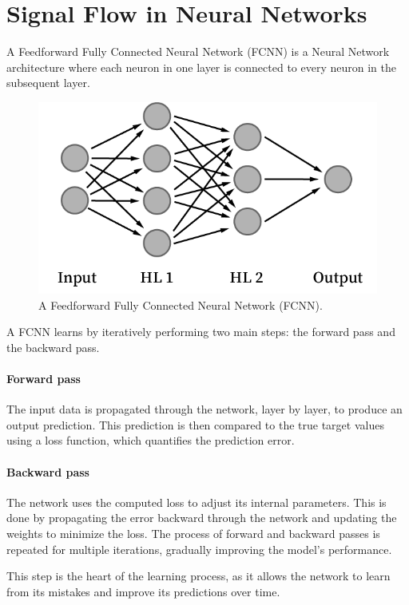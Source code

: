 \section*{Signal Flow in Neural Networks}

A Feedforward Fully Connected Neural Network (FCNN) is a Neural Network architecture where each neuron in one layer is connected to every neuron in the subsequent layer.

\begin{figure}[h]
    \centering
    \includegraphics[width=0.75\linewidth]{Images/fcnn.png}
    \caption{A Feedforward Fully Connected Neural Network (FCNN).}
    \label{fig:fcnn}
\end{figure}

A FCNN learns by iteratively performing two main steps: the forward pass and the backward pass.

\paragraph{Forward pass} The input data is propagated through the network, layer by layer, to produce an output prediction. This prediction is then compared to the true target values using a loss function, which quantifies the prediction error.

\paragraph{Backward pass} The network uses the computed loss to adjust its internal parameters. This is done by propagating the error backward through the network and updating the weights to minimize the loss. The process of forward and backward passes is repeated for multiple iterations, gradually improving the model's performance.

This step is the heart of the learning process, as it allows the network to learn from its mistakes and improve its predictions over time.
